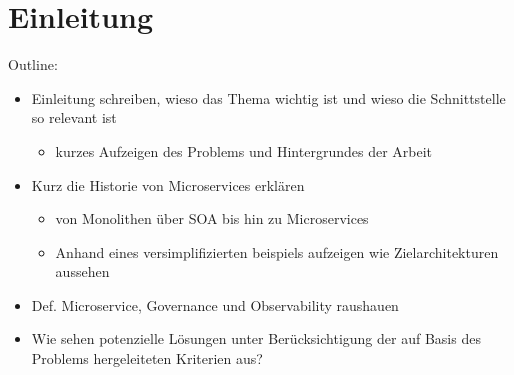 \documentclass[
	12pt,
	BCOR=5mm,
	DIV=12,
	headinclude=on,
	footinclude=off,
	parskip=half,
	bibliography=totoc,
	listof=entryprefix,
	toc=listof,
	numbers=noenddot,
	plainfootsepline
]{scrreprt}
\begin{document}






\normalfont



\tableofcontents

\listoffigures

\listoftables

\lstlistoflistings



\clearpage
\ihead{\chaptername~\thechapter}
\ohead{\headmark}


\chapter{Einleitung}
Outline:
\begin{itemize}
	\item Einleitung schreiben, wieso das Thema wichtig ist und wieso die Schnittstelle so relevant ist
	\begin{itemize}
		\item kurzes Aufzeigen des Problems und Hintergrundes der Arbeit
	\end{itemize}
	\item Kurz die Historie von Microservices erklären
	\begin{itemize}
		\item von Monolithen über SOA bis hin zu Microservices
		\item Anhand eines versimplifizierten beispiels aufzeigen wie Zielarchitekturen aussehen
	\end{itemize}
	\item Def. Microservice, Governance und Observability raushauen
	\item Wie sehen potenzielle Lösungen unter Berücksichtigung der auf Basis des Problems hergeleiteten Kriterien aus?
\end{itemize}


\end{document}
